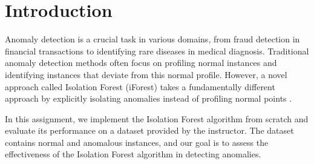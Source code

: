 \section{Introduction}
Anomaly detection is a crucial task in various domains, from fraud detection in financial transactions to identifying rare diseases in medical diagnosis. Traditional anomaly detection methods often focus on profiling normal instances and identifying instances that deviate from this normal profile. However, a novel approach called Isolation Forest (iForest) takes a fundamentally different approach by explicitly isolating anomalies instead of profiling normal points \cite{liu2008isolation}.

In this assignment, we implement the Isolation Forest algorithm from scratch and evaluate its performance on a dataset provided by the instructor. The dataset contains normal and anomalous instances, and our goal is to assess the effectiveness of the Isolation Forest algorithm in detecting anomalies.